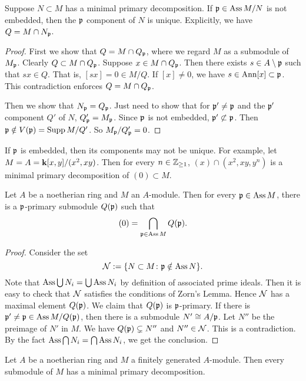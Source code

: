         \begin{proposition}\label{prop: uniqueness of primary components}
            Suppose $N\subset M$ has a minimal primary decomposition.
            If ${\mathfrak{p}} \in \operatorname{Ass} M/N$ is not embedded, then the ${\mathfrak{p}}$ component of $N$ is unique.
            Explicitly, we have $Q = M \cap N_{\mathfrak{p}}$.
        \end{proposition}
        \begin{proof}
            First we show that $Q = M \cap Q_{\mathfrak{p}}$, where we regard $M$ as a submodule of $M_{\mathfrak{p}}$.
            Clearly $Q \subset M \cap Q_{\mathfrak{p}}$.
            Suppose $x \in M \cap Q_{\mathfrak{p}}$.
            Then there exists $s \in A \setminus {\mathfrak{p}}$ such that $sx \in Q$.
            That is, $[sx] = 0 \in M/Q$.
            If $[x] \neq 0$, we have $s \in \operatorname{Ann} [x] \subset {\mathfrak{p}}$.
            This contradiction enforces $Q = M \cap Q_{\mathfrak{p}}$.

            Then we show that $N_{\mathfrak{p}} = Q_{\mathfrak{p}}$.
            Just need to show that for ${\mathfrak{p}}' \neq {\mathfrak{p}}$ and the ${\mathfrak{p}}'$ component $Q'$ of $N$, $Q'_{\mathfrak{p}} = M_{\mathfrak{p}}$.
            Since ${\mathfrak{p}}$ is not embedded, ${\mathfrak{p}}' \not\subset {\mathfrak{p}}$.
            Then ${\mathfrak{p}} \notin V({\mathfrak{p}}) = \operatorname{Supp} M/Q'$.
            So $M_{\mathfrak{p}}/Q'_{\mathfrak{p}} = 0$.
        \end{proof}

        \begin{example}
            If ${\mathfrak{p}}$ is embedded, then its components may not be unique.
            For example, let $M = A = {\mathbf{k}}[x,y]/(x^2,xy)$.
            Then for every $n \in {\mathbb{Z}}_{\geq 1}$, $(x) \cap (x^2,xy,y^n)$ is a minimal primary decomposition of $(0) \subset M$.
        \end{example}

        \begin{theorem}\label{thm: primary decomposition for general module}
            Let $A$ be a noetherian ring and $M$ an $A$-module.
            Then for every ${\mathfrak{p}} \in \operatorname{Ass} M$, there is a ${\mathfrak{p}}$-primary submodule $Q({\mathfrak{p}})$ such that 
            \[ (0) = \bigcap_{{\mathfrak{p}} \in \operatorname{Ass} M} Q({\mathfrak{p}}). \] 
        \end{theorem}
        \begin{proof}
            Consider the set 
            \[ {\mathcal{N}}:= \{N \subset M \colon {\mathfrak{p}} \notin \operatorname{Ass} N \}. \]
            Note that $\operatorname{Ass} \bigcup N_i = \bigcup \operatorname{Ass} N_i$ by definition of associated prime ideals.
            Then it is easy to check that ${\mathcal{N}}$ satisfies the conditions of Zorn's Lemma.
            Hence ${\mathcal{N}}$ has a maximal element $Q({\mathfrak{p}})$.
            We claim that $Q({\mathfrak{p}})$ is ${\mathfrak{p}}$-primary.
            If there is ${\mathfrak{p}}' \neq {\mathfrak{p}} \in \operatorname{Ass} M/Q({\mathfrak{p}})$, then there is a submodule $N' \cong A/{\mathfrak{p}}$.
            Let $N''$ be the preimage of $N'$ in $M$.
            We have $Q({\mathfrak{p}}) \subsetneq N''$ and $N'' \in {\mathcal{N}}$.
            This is a contradiction.
            By the fact $\operatorname{Ass} \bigcap N_i = \bigcap \operatorname{Ass} N_i$, we get the conclusion.
        \end{proof}

        \begin{corollary}\label{cor: primary decomposition for finitely generated module}
            Let $A$ be a noetherian ring and $M$ a finitely generated $A$-module.
            Then every submodule of $M$ has a minimal primary decomposition.
        \end{corollary}